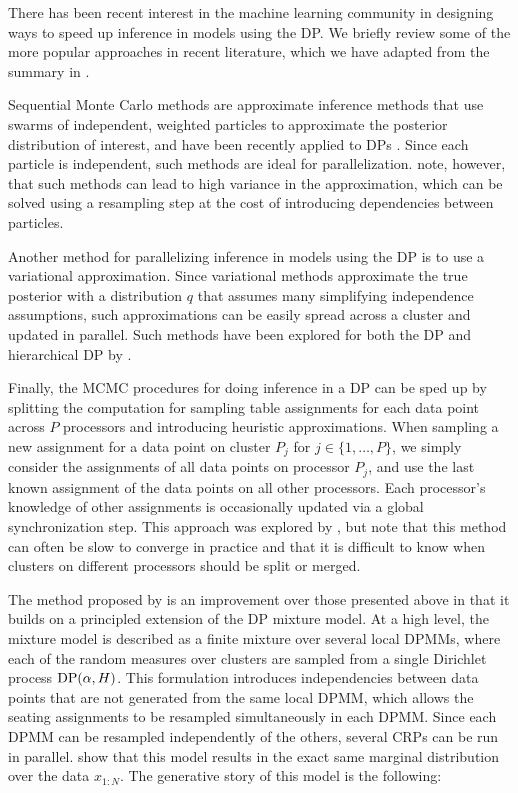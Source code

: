 There has been recent interest in the machine learning community in
designing ways to speed up inference in models using the DP. We
briefly review some of the more popular approaches in recent
literature, which we have adapted from the summary in
\cite{williamson2013}.

Sequential Monte Carlo methods are approximate inference methods that
use swarms of independent, weighted particles to approximate the
posterior distribution of interest, and have been recently applied to
DPs \cite{fearnhead2004, ulker2010, rodriguez2011, ahmed2011}. Since
each particle is independent, such methods are ideal for
parallelization. \cite{williamson2013} note, however, that such
methods can lead to high variance in the approximation, which can be
solved using a resampling step at the cost of introducing dependencies
between particles.

Another method for parallelizing inference in models using the DP is
to use a variational approximation. Since variational methods
approximate the true posterior with a distribution $q$ that assumes
many simplifying independence assumptions, such approximations can be
easily spread across a cluster and updated in parallel. Such methods
have been explored for both the DP and hierarchical DP by
\cite{blei2004, kurihara2007, teh2008, wang2011}.

Finally, the MCMC procedures for doing inference in a DP can be sped
up by splitting the computation for sampling table assignments for
each data point across $P$ processors and introducing heuristic
approximations. When sampling a new assignment for a data point on
cluster $P_j$ for $j \in \{1, \ldots, P\}$, we simply consider the
assignments of all data points on processor $P_j$, and use the last
known assignment of the data points on all other processors. Each
processor's knowledge of other assignments is occasionally updated via
a global synchronization step. This approach was explored by
\cite{asuncion2008}, but \cite{williamson2013} note that this method
can often be slow to converge in practice and that it is difficult to
know when clusters on different processors should be split or merged.

The method proposed by \cite{williamson2013} is an improvement over
those presented above in that it builds on a principled extension of
the DP mixture model. At a high level, the mixture model is described
as a finite mixture over several local DPMMs, where each of the random
measures over clusters are sampled from a single Dirichlet process
$\mathrm{DP}(\alpha, H)$. This formulation introduces independencies between
data points that are not generated from the same local DPMM, which
allows the seating assignments to be resampled simultaneously in each
DPMM. Since each DPMM can be resampled independently of the others,
several CRPs can be run in parallel. \cite{williamson2013} show that
this model results in the exact same marginal distribution over the
data $x_{1:N}$. The generative story of this model is the following:

